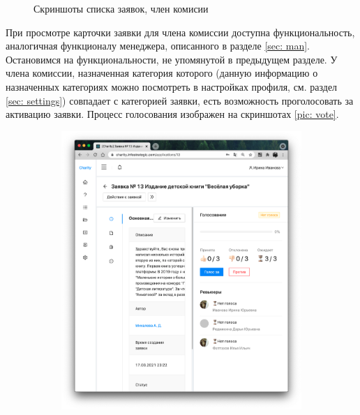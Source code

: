 \documentclass[a4paper,12pt,reqno]{article}
\begin{document}
\begin{figure}[H]
\begin{subfigure}[b]{0.475\linewidth}
		\end{subfigure}
		\caption{Скриншоты списка заявок, член комисии}
		\label{pic: app_super}
	\end{figure}
	
	При просмотре карточки заявки для члена комиссии доступна функциональность, аналогичная функционалу менеджера, описанного в разделе \ref{sec: man}. Остановимся на функциональности, не упомянутой в предыдущем разделе. У члена комиссии, назначенная категория которого (данную информацию о назначенных категориях можно посмотреть в настройках профиля, см. раздел \ref{sec: settings}) совпадает с категорией заявки, есть возможность проголосовать за активацию заявки. Процесс голосования изображен на скриншотах \ref{pic: vote}.
	
	
	\begin{figure}[H]
	    \centering
		\begin{subfigure}[b]{0.475\linewidth}
			\includegraphics[width=\linewidth]{img/ro/not_voted.png}
		\end{subfigure}
		\begin{subfigure}[b]{0.475\linewidth}

\end{subfigure}
\end{figure}
\end{document}

